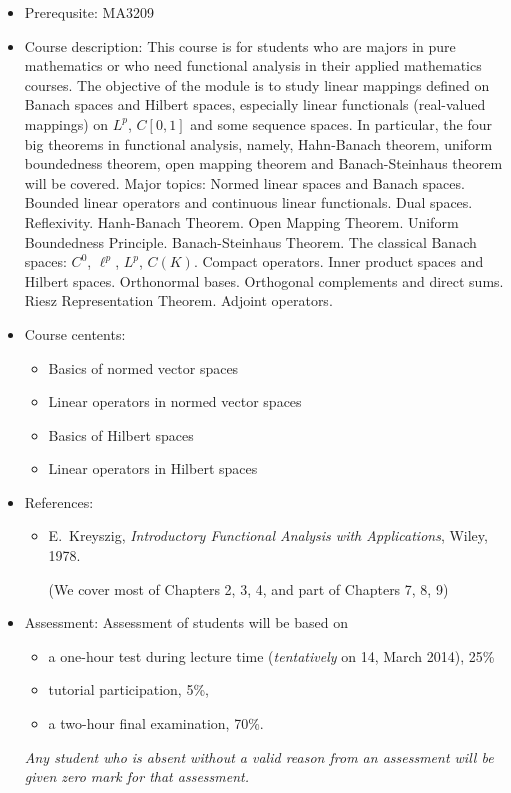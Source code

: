 \documentclass[a4paper]{article}
\begin{document}
\begin{itemize}
\item Prerequsite: MA3209
  
\item Course description: This course is for students who are majors in pure mathematics or who need functional analysis in their applied mathematics courses. The objective of the module is to study linear mappings defined on Banach spaces and Hilbert spaces, especially linear functionals (real-valued mappings) on $L^p$, $C[0,1]$ and some sequence spaces. In particular, the four big theorems in functional analysis, namely, Hahn-Banach theorem, uniform boundedness theorem, open mapping theorem and Banach-Steinhaus theorem will be covered. Major topics: Normed linear spaces and Banach spaces. Bounded linear operators and continuous linear functionals. Dual spaces. Reflexivity. Hanh-Banach Theorem. Open Mapping Theorem. Uniform Boundedness Principle. Banach-Steinhaus Theorem. The classical Banach spaces: $C^0$, $\ell^p$, $L^p$, $C(K)$. Compact operators. Inner product spaces and Hilbert spaces. Orthonormal bases. Orthogonal complements and direct sums. Riesz Representation Theorem. Adjoint operators.
  
\item Course centents:
  \begin{itemize}
  \item 
    Basics of normed vector spaces
  \item 
    Linear operators in normed vector spaces
  \item 
    Basics of Hilbert spaces
  \item 
    Linear operators in Hilbert spaces
  \end{itemize}
\item References:
  \begin{itemize}
  \item
    E.~Kreyszig, \emph{Introductory Functional Analysis with Applications}, Wiley, 1978.
    
    (We cover most of Chapters 2, 3, 4, and part of Chapters 7, 8, 9)
  \end{itemize}
\item Assessment:
  Assessment of students will be based on
  \begin{itemize}
  \item a one-hour test during lecture time (\emph{tentatively} on 14, March 2014), 25\%
  \item tutorial participation, 5\%,
  \item a two-hour final examination, 70\%.
  \end{itemize}
  \emph{Any student who is absent without a valid reason from an assessment will be given zero mark for that assessment.}
\end{itemize}
\end{document}
